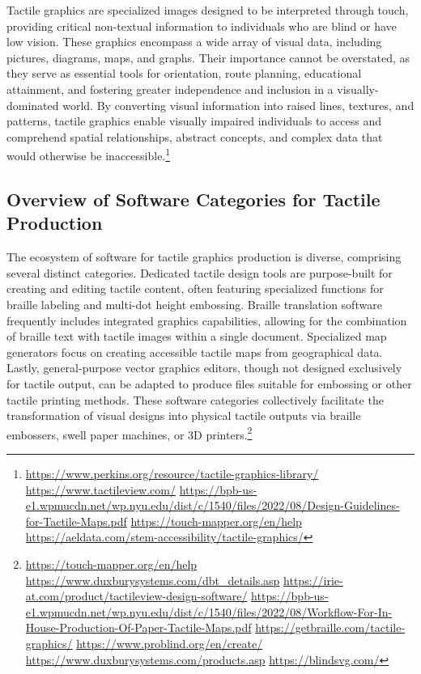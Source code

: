 Tactile graphics are specialized images designed to be interpreted through touch, providing critical non-textual information to individuals who are blind or have low vision. These graphics encompass a wide array of visual data, including pictures, diagrams, maps, and graphs. Their importance cannot be overstated, as they serve as essential tools for orientation, route planning, educational attainment, and fostering greater independence and inclusion in a visually-dominated world. By converting visual information into raised lines, textures, and patterns, tactile graphics enable visually impaired individuals to access and comprehend spatial relationships, abstract concepts, and complex data that would otherwise be inaccessible.\footnote{\url{https://www.perkins.org/resource/tactile-graphics-library/} \url{https://www.tactileview.com/} \url{https://bpb-us-e1.wpmucdn.net/wp.nyu.edu/dist/c/1540/files/2022/08/Design-Guidelines-for-Tactile-Maps.pdf} \url{https://touch-mapper.org/en/help} \url{https://aeldata.com/stem-accessibility/tactile-graphics/}}

\subsection{Overview of Software Categories for Tactile Production}

The ecosystem of software for tactile graphics production is diverse, comprising several distinct categories. Dedicated tactile design tools are purpose-built for creating and editing tactile content, often featuring specialized functions for braille labeling and multi-dot height embossing. Braille translation software frequently includes integrated graphics capabilities, allowing for the combination of braille text with tactile images within a single document. Specialized map generators focus on creating accessible tactile maps from geographical data. Lastly, general-purpose vector graphics editors, though not designed exclusively for tactile output, can be adapted to produce files suitable for embossing or other tactile printing methods. These software categories collectively facilitate the transformation of visual designs into physical tactile outputs via braille embossers, swell paper machines, or 3D printers.\footnote{\url{https://touch-mapper.org/en/help} \url{https://www.duxburysystems.com/dbt_details.asp} \url{https://irie-at.com/product/tactileview-design-software/} \url{https://bpb-us-e1.wpmucdn.net/wp.nyu.edu/dist/c/1540/files/2022/08/Workflow-For-In-House-Production-Of-Paper-Tactile-Maps.pdf} \url{https://getbraille.com/tactile-graphics/} \url{https://www.problind.org/en/create/} \url{https://www.duxburysystems.com/products.asp} \url{https://blindsvg.com/}}


